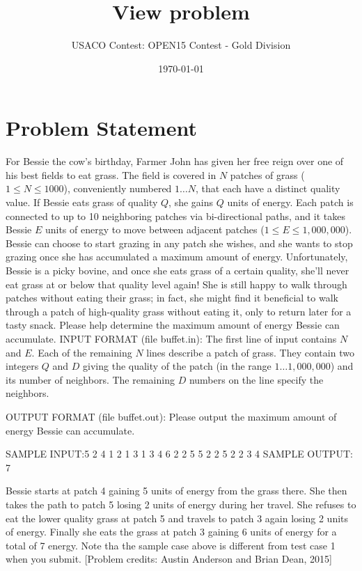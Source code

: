 \documentclass[12pt]{article}
\title{View problem}
\author{USACO Contest: OPEN15 Contest - Gold Division}
\date{\today}
\begin{document}
\maketitle

\section*{Problem Statement}

For Bessie the cow’s birthday, Farmer John has given her free reign over one
of his best fields to eat grass.  
The field is covered in $N$ patches of grass ($1 \le N \le 1000$), conveniently 
numbered $1\ldots N$, that each have a distinct quality value.  If Bessie eats
grass of quality $Q$, she gains $Q$ units of energy.  Each patch is connected to
up to 10 neighboring patches via bi-directional paths, and it takes Bessie $E$
units of energy to move between adjacent patches ($1 \le E \le 1,000,000$). 
Bessie can choose to start grazing in any patch she wishes, and she wants to
stop grazing once she has accumulated a maximum amount of energy.  
Unfortunately, Bessie is a picky bovine, and once she eats grass of a certain 
quality, she’ll never eat grass at or below that quality level again!  She is
still happy to walk through patches without eating their grass; in fact, she 
might find it beneficial to walk through a patch of high-quality grass without
eating it, only to return later for a tasty snack.
Please help determine the maximum amount of energy Bessie can accumulate.
INPUT FORMAT (file buffet.in):
The first line of input contains $N$ and $E$.  Each of the remaining $N$ lines
describe a patch of grass.  They contain two integers $Q$ and $D$ giving the
quality of the patch (in the range $1\ldots 1,000,000$) and its number of 
neighbors.  The remaining $D$ numbers on the line specify the neighbors.

OUTPUT FORMAT (file buffet.out):
Please output the maximum amount of energy Bessie can accumulate.

SAMPLE INPUT:5 2
4 1 2
1 3 1 3 4
6 2 2 5
5 2 2 5
2 2 3 4
SAMPLE OUTPUT: 7

Bessie starts at patch 4 gaining 5 units of energy from the grass there.  She
then takes the path to patch 5 losing 2 units of energy during her travel.
She refuses to eat the lower quality grass at patch 5 and travels to patch 3
again losing 2 units of energy.  Finally she eats the grass at patch 3 gaining 6 units of energy
for a total of 7 energy.
Note tha the sample case above is different from test case 1 when you submit.
[Problem credits: Austin Anderson and Brian Dean, 2015]
\end{document}
